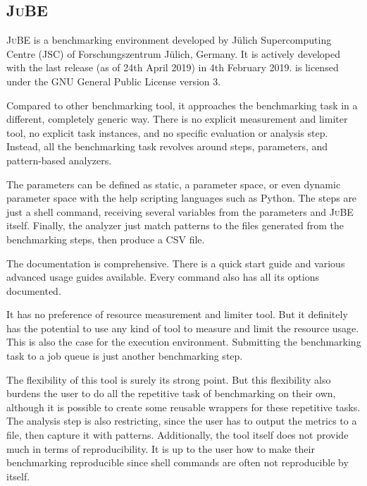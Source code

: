\subsection{\textsc{JuBE}}

\textsc{JuBE} \citep{frings2010flexible} is a benchmarking environment developed by Jülich Supercomputing Centre (JSC) of Forschungszentrum Jülich, Germany.
It is actively developed  with the last release (as of 24th April 2019) in 4th February 2019.
 is licensed under the GNU General Public License version 3.

Compared to other benchmarking tool, it approaches the benchmarking task in a different, completely generic way.
There is no explicit measurement and limiter tool, no explicit task instances, and no specific evaluation or analysis step.
Instead, all the benchmarking task revolves around steps, parameters, and pattern-based analyzers.

The parameters can be defined as static, a parameter space, or even dynamic parameter space with the help scripting languages such as Python.
The steps are just a shell command, receiving several variables from the parameters and \textsc{JuBE} itself.
Finally, the analyzer just match patterns to the files generated from the benchmarking steps, then produce a CSV file.

The documentation is comprehensive.
There is a quick start guide and various advanced usage guides available.
Every command also has all its options documented.

It has no preference of resource measurement and limiter tool.
But it definitely has the potential to use any kind of tool to measure and limit the resource usage.
This is also the case for the execution environment.
Submitting the benchmarking task to a job queue is just another benchmarking step.

The flexibility of this tool is surely its strong point.
But this flexibility also burdens the user to do all the repetitive task of benchmarking on their own, although it is possible to create some reusable wrappers for these repetitive tasks.
The analysis step is also restricting, since the user has to output the metrics to a file, then capture it with patterns.
Additionally, the tool itself does not provide much in terms of reproducibility.
It is up to the user how to make their benchmarking reproducible since shell commands are often not reproducible by itself.


